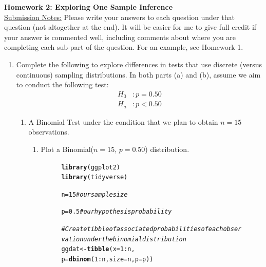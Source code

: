 \documentclass{article}\usepackage[]{graphicx}\usepackage[]{xcolor}
\makeatletter
\newcommand{\hlnum}[1]{\textcolor[rgb]{0.686,0.059,0.569}{#1}}%
\newcommand{\hlcom}[1]{\textcolor[rgb]{0.678,0.584,0.686}{\textit{#1}}}%
\newcommand{\hlopt}[1]{\textcolor[rgb]{0,0,0}{#1}}%
\newcommand{\hldef}[1]{\textcolor[rgb]{0.345,0.345,0.345}{#1}}%
\newcommand{\hlkwb}[1]{\textcolor[rgb]{0.69,0.353,0.396}{#1}}%
\newcommand{\hlkwc}[1]{\textcolor[rgb]{0.333,0.667,0.333}{#1}}%
\newcommand{\hlkwd}[1]{\textcolor[rgb]{0.737,0.353,0.396}{\textbf{#1}}}%
\newenvironment{kframe}{%
 \def\at@end@of@kframe{}%
 \ifinner\ifhmode%
  \def\at@end@of@kframe{\end{minipage}}%
  \begin{minipage}{\columnwidth}%
 \fi\fi%
 \def\FrameCommand##1{\hskip\@totalleftmargin \hskip-\fboxsep
 \colorbox{shadecolor}{##1}\hskip-\fboxsep
     \hskip-\linewidth \hskip-\@totalleftmargin \hskip\columnwidth}%
 \MakeFramed {\advance\hsize-\width
   \@totalleftmargin\z@ \linewidth\hsize
   \@setminipage}}%
 {\par\unskip\endMakeFramed%
 \at@end@of@kframe}
\newenvironment{knitrout}{}{} %
\makeatother
\begin{document}
\noindent\textbf{Homework 2: Exploring One Sample Inference}\\
\noindent\makebox[\linewidth]{\rule{\textwidth}{0.4pt}}
\noindent\underline{Submission Notes:} Please write your answers to each 
question under that question (not altogether at the end). It will be easier for 
me to give full credit if your answer is commented well, including comments 
about where you are completing each sub-part of the question. For an example,
see Homework 1.\\
\noindent\makebox[\linewidth]{\rule{\textwidth}{0.4pt}}

\begin{enumerate}
  \item Complete the following to explore differences in tests that use discrete 
  (versus continuous) sampling distributions. In both parts (a) and (b), assume
  we aim to conduct the following test:
  \begin{align*}
    H_0&: p = 0.50\\
    H_a&: p < 0.50
  \end{align*}
  \begin{enumerate}
    \item A Binomial Test under the condition that we plan to obtain $n=15$ 
    observations.
    \begin{enumerate}
      \item Plot a Binomial($n=15$, $p=0.50$) distribution.
      
      \begin{figure}[H]
\begin{knitrout}\scriptsize
{}\color{fgcolor}\begin{kframe}
\begin{alltt}
\hlkwd{library}\hldef{(ggplot2)}
\hlkwd{library}\hldef{(tidyverse)}

\hldef{n} \hlkwb{=} \hlnum{15} \hlcom{#our sample size}

\hldef{p} \hlkwb{=} \hlnum{0.5} \hlcom{#our hypothesis probability}

\hlcom{#Create tibble of associated probabilities of each observation under the binomial distribution}
\hldef{ggdat} \hlkwb{<-} \hlkwd{tibble}\hldef{(}\hlkwc{x} \hldef{=} \hlnum{1}\hlopt{:}\hldef{n,}
                \hlkwc{p} \hldef{=} \hlkwd{dbinom}\hldef{(}\hlnum{1}\hlopt{:}\hldef{n,}\hlkwc{size} \hldef{= n,} \hlkwc{p} \hldef{= p))}


\end{alltt}
\end{kframe}
\end{knitrout}
\end{figure}
\end{enumerate}
\end{enumerate}
\end{enumerate}
\end{document}
